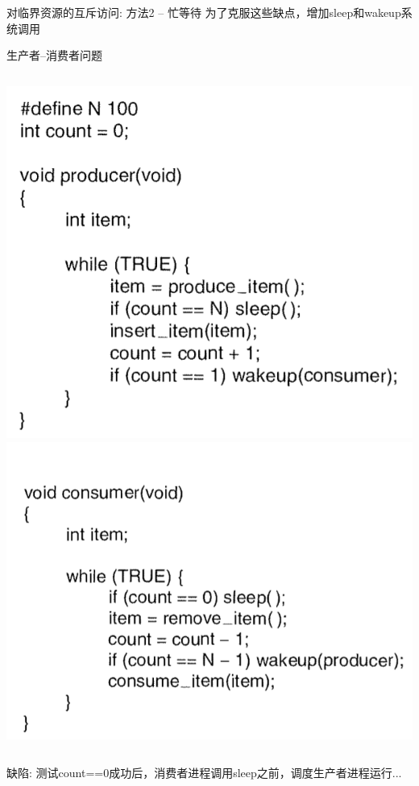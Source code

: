 \documentclass[xcolor=svgnames]{beamer}
\begin{document}
\begin{CJK*}{UTF8}{gbsn}
\begin{frame}{对临界资源的互斥访问: 方法2 -- 忙等待}
为了克服这些缺点，增加sleep和wakeup系统调用
\end{frame}

\begin{frame}{生产者--消费者问题}
\begin{columns}[b]
\includegraphics[width=1.0\textwidth]{prod.png}
\includegraphics[width=1.0\textwidth]{consum.png}
\end{columns}%

缺陷: 测试count==0成功后，消费者进程调用sleep之前，调度生产者进程运行...
\end{frame}


\end{CJK*}
\end{document}
